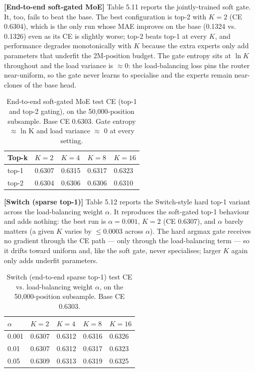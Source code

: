 \textbf{[End-to-end soft-gated MoE]} Table 5.11 reports the jointly-trained soft gate. It, too, fails to beat the base. The best configuration is top-2 with $K=2$ (CE 0.6304), which is the only run whose MAE improves on the base (0.1324 vs. 0.1326) even as its CE is slightly worse; top-2 beats top-1 at every $K$, and performance degrades monotonically with $K$ because the extra experts only add parameters that underfit the 2M-position budget. The gate entropy sits at $\ln K$ throughout and the load variance is $\approx 0$: the load-balancing loss pins the router near-uniform, so the gate never learns to specialise and the experts remain near-clones of the base head.

\begin{table}[H]
	\centering
	\small
	\begin{tabular}{lllll}
		\toprule
		Top-k & $K{=}2$ & $K{=}4$ & $K{=}8$ & $K{=}16$ \\
		\midrule
		top-1 & 0.6307 & 0.6315 & 0.6317 & 0.6323 \\
		top-2 & 0.6304 & 0.6306 & 0.6306 & 0.6310 \\
		\bottomrule
	\end{tabular}
	\caption{End-to-end soft-gated MoE test CE (top-1 and top-2 gating), on the 50,000-position subsample. Base CE 0.6303. Gate entropy $\approx$ ln K and load variance $\approx$ 0 at every setting.}
	\label{tab:5.11}
\end{table}

\textbf{[Switch (sparse top-1)]} Table 5.12 reports the Switch-style hard top-1 variant across the load-balancing weight $\alpha$. It reproduces the soft-gated top-1 behaviour and adds nothing: the best run is $\alpha{=}0.001$, $K{=}2$ (CE 0.6307), and $\alpha$ barely matters (a given $K$ varies by $\leq 0.0003$ across $\alpha$). The hard argmax gate receives no gradient through the CE path — only through the load-balancing term — so it drifts toward uniform and, like the soft gate, never specialises; larger $K$ again only adds underfit parameters.

\begin{table}[H]
	\centering
	\small
	\begin{tabular}{lllll}
		\toprule
		$\alpha$ & $K{=}2$ & $K{=}4$ & $K{=}8$ & $K{=}16$ \\
		\midrule
		0.001 & 0.6307 & 0.6312 & 0.6316 & 0.6326 \\
		0.01 & 0.6307 & 0.6312 & 0.6317 & 0.6323 \\
		0.05 & 0.6309 & 0.6313 & 0.6319 & 0.6325 \\
		\bottomrule
	\end{tabular}
	\caption{Switch (end-to-end sparse top-1) test CE vs. load-balancing weight $\alpha$, on the 50,000-position subsample. Base CE 0.6303.}
	\label{tab:5.12}
\end{table}

